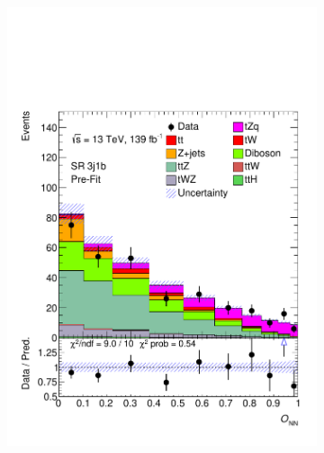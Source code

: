 \begin{figure}[!h]
\begin{subfigure}[b]{0.33\linewidth}
    \includegraphics[width=\textwidth]{ubonn-thesis/Chapters/Chapters_07/Figure/Data/SR_3j1b.pdf} 
  \end{subfigure} 
  \begin{subfigure}[b]{0.33\linewidth}
    \centering

\end{subfigure}
\end{figure}
